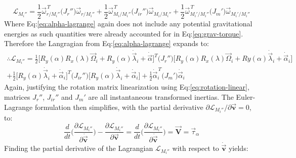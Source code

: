 \begin{equation}\label{eq:alpha-lagrange}
\mathcal{L}_{M_i''}=\frac{1}{2}\vec{\omega}_{r/M_i''}^{\hspace{2pt}T}\big(J_{r}''\big)\vec{\omega}_{r/M_i''}+\frac{1}{2}\vec{\omega}_{M_i/M_i''}^{\hspace{2pt}T}\big(J_{ir}''\big)\vec{\omega}_{M_i/M_i''}+\frac{1}{2}\vec{\omega}_{M_i'/M_i''}^{\hspace{2pt}T}\big(J_{m}'\big)\vec{\omega}_{M_i'/M_i''}
\end{equation}
Where Eq:\ref{eq:alpha-lagrange} again does not include any potential gravitational energies as such quantities were already accounted for in Eq:\ref{eq:grav-torque}. Therefore the Langragian from Eq:\ref{eq:alpha-lagrange} expands to:
\begin{multline}\label{eq:alpha-lagrange-two}
\therefore\mathcal{L}_{M_i''}=\frac{1}{2}\Big[R_y(\alpha)R_x(\lambda)\vec{\Omega}_i+R_y(\alpha)\dot{\vec{\lambda}}_i+\dot{\vec{\alpha}}\Big]^T\big(J_r''\big)\Big[R_y(\alpha)R_x(\lambda)\vec{\Omega}_i+Ry(\alpha)\dot{\vec{\lambda}}_i+\dot{\vec{\alpha}}_i\Big]\\
+\frac{1}{2}\Big[R_y(\alpha)\dot{\vec{\lambda}}_i+\dot{\vec{\alpha}}_i\Big]^T\big(J_{ir}''\big)\Big[R_y(\alpha)\dot{\vec{\lambda}}_i+\dot{\vec{\alpha}}_i\Big]
+\frac{1}{2}\dot{\vec{\alpha}}_i^{\hspace{2pt}T}\big(J_m'\big)\dot{\vec{\alpha}}_i
\end{multline}
Again, justifying the rotation matrix linearization using Eq:\ref{eq:rotation-linear}, matrices $J_r''$, $J_{ir}''$ and $J_m'$ are all instantaneous transformed inertias. The Euler-Lagrange formulation then simplifies, with the partial derivative $\partial\mathcal{L}_{M_i''}/\partial\vec{\mathbf{v}}=0$, to:
\begin{equation}
\frac{d}{dt}\Bigg(\frac{\partial\mathcal{L}_{M_i''}}{\partial\dot{\vec{\mathbf{v}}}}\Bigg)-\frac{\partial\mathcal{L}_{M_i''}}{\partial\vec{\mathbf{v}}}=\frac{d}{dt}\Bigg(\frac{\partial\mathcal{L}_{M_i''}}{\partial\dot{\vec{\mathbf{v}}}}\Bigg)=\vec{\mathbf{V}}=\vec{\tau}_\alpha
\end{equation}
Finding the partial derivative of the Lagrangian $\mathcal{L}_{M_i''}$ with respect to $\dot{\vec{\mathbf{v}}}$ yields:
